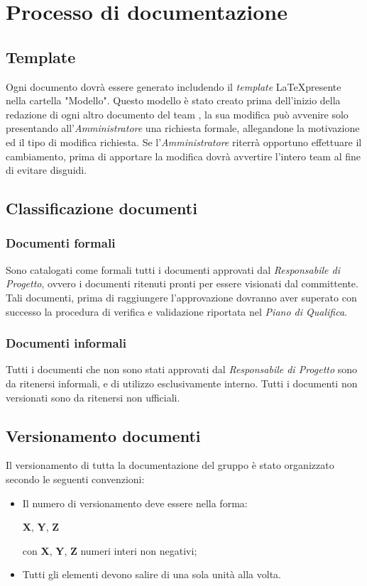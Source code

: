 \section{Processo di documentazione}
\subsection{Template}
Ogni documento dovrà essere generato includendo il \textit{template} \LaTeX presente nella cartella "Modello".
Questo modello è stato creato prima dell'inizio della redazione di ogni altro documento del team \gruppo, la sua modifica può avvenire solo presentando all'\textit{Amministratore} una richiesta formale, allegandone la motivazione ed il tipo di modifica richiesta. Se l'\textit{Amministratore} riterrà opportuno effettuare il cambiamento, prima di apportare la modifica dovrà avvertire l'intero team al fine di evitare disguidi.

\subsection{Classificazione documenti}
\subsubsection{Documenti formali}
Sono catalogati come formali tutti i documenti approvati dal \textit{Responsabile di Progetto}, ovvero i documenti ritenuti pronti per essere visionati dal committente. Tali documenti, prima di raggiungere l'approvazione dovranno aver superato con successo la procedura di verifica e validazione riportata nel \textit{Piano di Qualifica}.
\subsubsection{Documenti informali}
Tutti i documenti che non sono stati approvati dal \textit{Responsabile di Progetto} sono da ritenersi informali, e di utilizzo esclusivamente interno. Tutti i documenti non versionati sono da ritenersi non ufficiali.

\subsection{Versionamento documenti}
Il versionamento di tutta la documentazione del gruppo \gruppo è stato organizzato secondo le seguenti convenzioni:
\begin{itemize}
\item Il numero di versionamento deve essere nella forma:

\begin{center}
\textbf{X}, \textbf{Y}, \textbf{Z}
\end{center}

con \textbf{X}, \textbf{Y}, \textbf{Z} numeri interi non negativi;
\item Tutti gli elementi devono salire di una sola unità alla volta.
\end{itemize}

